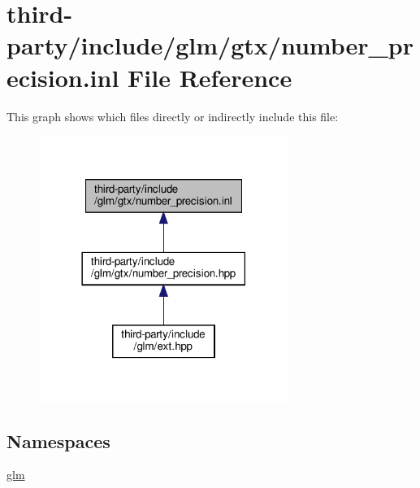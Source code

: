 \hypertarget{number__precision_8inl}{}\section{third-\/party/include/glm/gtx/number\+\_\+precision.inl File Reference}
\label{number__precision_8inl}
This graph shows which files directly or indirectly include this file\+:
\nopagebreak
\begin{figure}[H]
\begin{center}
\leavevmode
\includegraphics[width=230pt]{number__precision_8inl__dep__incl}
\end{center}
\end{figure}
\subsection*{Namespaces}
\begin{DoxyCompactItemize}
\item 
 \hyperlink{namespaceglm}{glm}
\end{DoxyCompactItemize}
